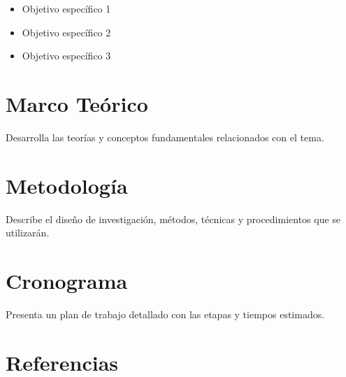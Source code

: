 \documentclass[12pt,a4paper]{article}
\begin{document}
\begin{itemize}
    \item Objetivo específico 1
    \item Objetivo específico 2
    \item Objetivo específico 3
\end{itemize}

\section{Marco Teórico}

Desarrolla las teorías y conceptos fundamentales relacionados con el tema.

\section{Metodología}

Describe el diseño de investigación, métodos, técnicas y procedimientos que se utilizarán.

\section{Cronograma}

Presenta un plan de trabajo detallado con las etapas y tiempos estimados.

\section{Referencias}



\end{document}
